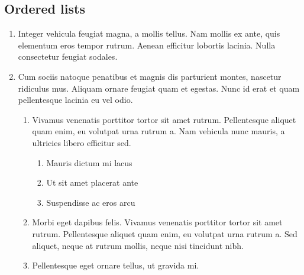 \documentclass[letterpaper,10pt,english]{sphinxmanual}
\begin{document}
\subsection{Ordered lists}
\label{\detokenize{specimen:ordered-lists}}\begin{enumerate}
%
\item {} 
Integer vehicula feugiat magna, a mollis tellus. Nam mollis ex ante,
quis elementum eros tempor rutrum. Aenean efficitur lobortis lacinia.
Nulla consectetur feugiat sodales.

\item {} 
Cum sociis natoque penatibus et magnis dis parturient montes,
nascetur ridiculus mus. Aliquam ornare feugiat quam et egestas. Nunc
id erat et quam pellentesque lacinia eu vel odio.
\begin{enumerate}
%
\item {} 
Vivamus venenatis porttitor tortor sit amet rutrum. Pellentesque
aliquet quam enim, eu volutpat urna rutrum a. Nam vehicula nunc
mauris, a ultricies libero efficitur sed.
\begin{enumerate}
%
\item {} 
Mauris dictum mi lacus

\item {} 
Ut sit amet placerat ante

\item {} 
Suspendisse ac eros arcu

\end{enumerate}

\item {} 
Morbi eget dapibus felis. Vivamus venenatis porttitor tortor sit
amet rutrum. Pellentesque aliquet quam enim, eu volutpat urna
rutrum a. Sed aliquet, neque at rutrum mollis, neque nisi
tincidunt nibh.

\item {} 
Pellentesque eget  ornare tellus, ut gravida
mi.


\end{enumerate}
\end{enumerate}
\end{document}
